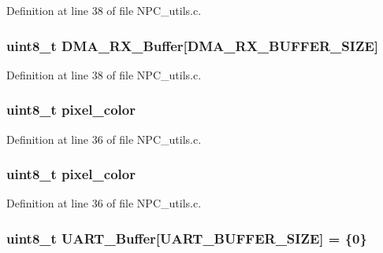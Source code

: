 Definition at line 38 of file N\+P\+C\+\_\+utils.\+c.

\subsubsection[{\texorpdfstring{D\+M\+A\+\_\+\+R\+X\+\_\+\+Buffer}{DMA_RX_Buffer}}]{\setlength{\rightskip}{0pt plus 5cm}uint8\+\_\+t D\+M\+A\+\_\+\+R\+X\+\_\+\+Buffer\mbox{[}{\bf D\+M\+A\+\_\+\+R\+X\+\_\+\+B\+U\+F\+F\+E\+R\+\_\+\+S\+I\+ZE}\mbox{]}}\hypertarget{group___utils_gaead30033cf45bc8bbfab301a6c770afb}{}\label{group___utils_gaead30033cf45bc8bbfab301a6c770afb}


Definition at line 38 of file N\+P\+C\+\_\+utils.\+c.

\subsubsection[{\texorpdfstring{pixel\+\_\+color}{pixel_color}}]{\setlength{\rightskip}{0pt plus 5cm}uint8\+\_\+t pixel\+\_\+color}\hypertarget{group___utils_ga91a0f4b54880f52e0b02f7aeb96ca304}{}\label{group___utils_ga91a0f4b54880f52e0b02f7aeb96ca304}


Definition at line 36 of file N\+P\+C\+\_\+utils.\+c.

\subsubsection[{\texorpdfstring{pixel\+\_\+color}{pixel_color}}]{\setlength{\rightskip}{0pt plus 5cm}uint8\+\_\+t pixel\+\_\+color}\hypertarget{group___utils_ga91a0f4b54880f52e0b02f7aeb96ca304}{}\label{group___utils_ga91a0f4b54880f52e0b02f7aeb96ca304}


Definition at line 36 of file N\+P\+C\+\_\+utils.\+c.

\subsubsection[{\texorpdfstring{U\+A\+R\+T\+\_\+\+Buffer}{UART_Buffer}}]{\setlength{\rightskip}{0pt plus 5cm}uint8\+\_\+t U\+A\+R\+T\+\_\+\+Buffer\mbox{[}{\bf U\+A\+R\+T\+\_\+\+B\+U\+F\+F\+E\+R\+\_\+\+S\+I\+ZE}\mbox{]} = \{0\}}\hypertarget{group___utils_gab42d904ed5954df151e40839a2351427}{}\label{group___utils_gab42d904ed5954df151e40839a2351427}


